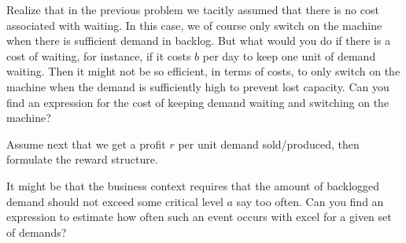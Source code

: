 \begin{exercise}
  Realize that in the previous problem we tacitly assumed that there
  is no cost associated with waiting.  In this case, we of course only
  switch on the machine when there is sufficient demand in
  backlog. But what would you do if there is a cost of waiting, for
  instance, if it costs $b$ per day to keep one unit of demand
  waiting. Then it might not be so efficient, in terms of costs, to
  only switch on the machine when the demand is sufficiently high to
  prevent lost capacity. Can you find an expression for the cost of
  keeping demand waiting and switching on the machine?

\end{exercise}

\begin{exercise}
  Assume next that we get a profit $r$ per unit demand sold/produced, then
formulate the reward structure.

\end{exercise}

\begin{exercise}
  It might be that the business context requires that the amount of
  backlogged demand should not exceed some critical level $a$ say too
  often. Can you find an expression to estimate how often such an
  event occurs with excel for a given set of demands?

\end{exercise}

